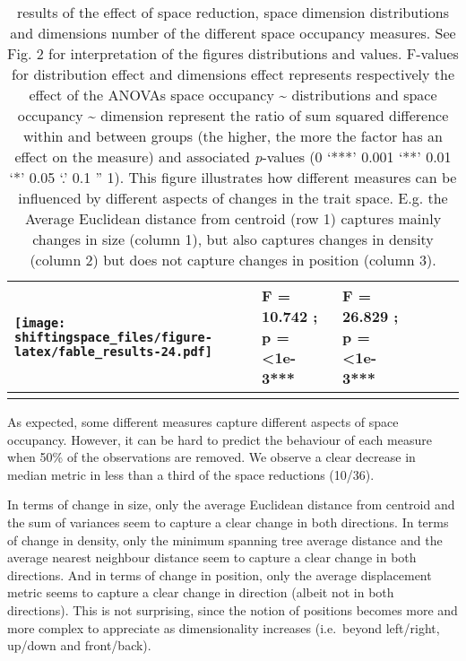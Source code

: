 \documentclass[]{article}
\begin{document}
\begin{longtable}[]{@{}llllll@{}}
\begin{minipage}[t]{0.13\columnwidth}
\texttt{[image: shiftingspace\_files/figure-latex/fable\_results-24.pdf]}\strut
\end{minipage} & \begin{minipage}[t]{0.17\columnwidth}\raggedright\strut
F = 10.742 ; p = \textless{}1e-3***\strut
\end{minipage} & \begin{minipage}[t]{0.16\columnwidth}\raggedright\strut
F = 26.829 ; p = \textless{}1e-3***\strut
\end{minipage}\tabularnewline
\bottomrule
\caption{results of the effect of space reduction, space dimension
distributions and dimensions number of the different space occupancy
measures. See Fig. 2 for interpretation of the figures distributions and
values. F-values for distribution effect and dimensions effect
represents respectively the effect of the ANOVAs space occupancy
\textasciitilde{} distributions and space occupancy \textasciitilde{}
dimension represent the ratio of sum squared difference within and
between groups (the higher, the more the factor has an effect on the
measure) and associated \emph{p}-values (0 `***' 0.001 `**' 0.01 `*'
0.05 `.' 0.1 '' 1). This figure illustrates how different measures can
be influenced by different aspects of changes in the trait space. E.g.
the Average Euclidean distance from centroid (row 1) captures mainly
changes in size (column 1), but also captures changes in density (column
2) but does not capture changes in position (column 3).}
\end{longtable}

\renewcommand\baselinestretch{1.6}\selectfont

As expected, some different measures capture different aspects of space
occupancy. However, it can be hard to predict the behaviour of each
measure when 50\% of the observations are removed. We observe a clear
decrease in median metric in less than a third of the space reductions
(10/36).

In terms of change in size, only the average Euclidean distance from
centroid and the sum of variances seem to capture a clear change in both
directions. In terms of change in density, only the minimum spanning
tree average distance and the average nearest neighbour distance seem to
capture a clear change in both directions. And in terms of change in
position, only the average displacement metric seems to capture a clear
change in direction (albeit not in both directions). This is not
surprising, since the notion of positions becomes more and more complex
to appreciate as dimensionality increases (i.e.~beyond left/right,
up/down and front/back).
\end{document}
